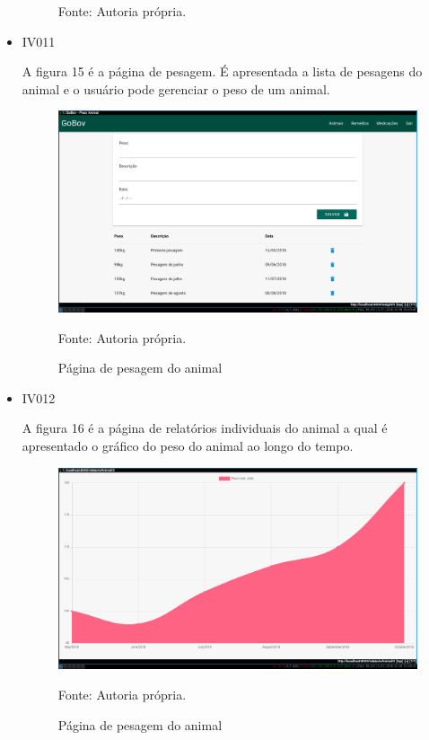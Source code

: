 \begin{itemize}
\begin{figure}[]
\begin{center}
		Fonte: Autoria própria.
	\end{center}
\end{figure}

\newpage
\item IV011

A figura 15 é a página de pesagem. É apresentada a lista de pesagens do animal e o usuário pode gerenciar o peso de um animal.
\begin{figure}[H]
	\begin{center}
		\caption{Página de pesagem do animal}
		\includegraphics[width=\textwidth]{../img/prototipos/addPeso.png}

		Fonte: Autoria própria.
	\end{center}
\end{figure}

\item IV012

A figura 16 é a página de relatórios individuais do animal a qual é apresentado o gráfico do peso do animal ao longo do tempo.
\begin{figure}[H]
	\begin{center}
		\caption{Página de pesagem do animal}
		\includegraphics[width=\textwidth]{../img/prototipos/relatorio.png}

		Fonte: Autoria própria.
	\end{center}
\end{figure}

\end{itemize}

